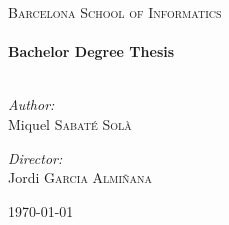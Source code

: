 

\begin{titlepage}
\begin{center}

\textsc{\Large Barcelona School of Informatics}\\[0.5cm]

{ \small \HRule \\[0.4cm] }
{ \huge \bf Bachelor Degree Thesis \\[0.4cm] }
{ \small \HRule \\[0.4cm] }

\begin{minipage}{0.4\textwidth}
\begin{flushleft} \large
\emph{Author:}\\
Miquel \textsc{Sabaté Solà}
\end{flushleft}
\end{minipage}
\begin{minipage}{0.4\textwidth}
\begin{flushright} \large
\emph{Director:} \\
Jordi \textsc{Garcia Almiñana}
\end{flushright}
\end{minipage}

\vfill

{\large \today}

\end{center}
\end{titlepage}
